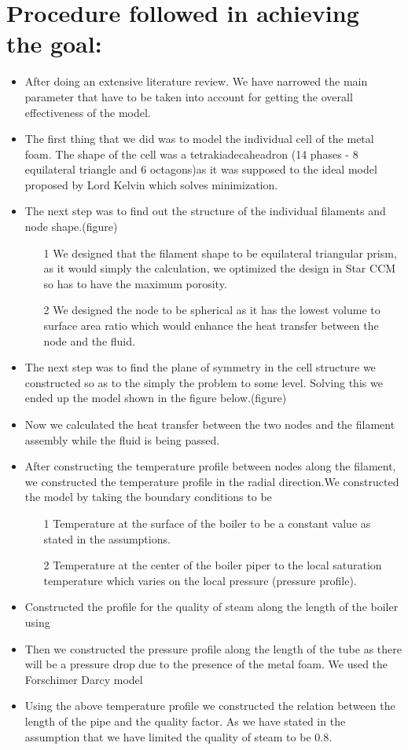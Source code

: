 \documentclass[compileTAMUreport.tex]{subfiles}
\begin{document}
\section{Procedure followed in achieving the goal:}
\begin{itemize}
\item After doing an extensive literature review. We have narrowed the main parameter that have to be taken into account for getting the overall effectiveness of the model.
\item The first thing that we did was to model the individual cell of the metal foam. The shape of the cell was a tetrakiadecaheadron (14 phases - 8 equilateral triangle and 6 octagons)as it was supposed to the ideal model proposed by Lord Kelvin which solves minimization.
\item The next step was to find out the structure of the individual filaments and node shape.(figure)
\begin{itemize}
\item[1] We designed that the filament shape to be equilateral triangular prism, as it would simply the calculation, we optimized the design in Star CCM so has to have the maximum porosity.
\item[2] We designed the node to be spherical as it has the lowest volume to surface area ratio which would enhance the heat transfer between the node and the fluid.
\end{itemize}
\item	The next step was to find the plane of symmetry in the cell structure we constructed so as to the simply the problem to some level. Solving this we ended up the model shown in the figure below.(figure)
\item	Now we calculated the heat transfer between the two nodes and the filament assembly while the fluid is being passed.
\item After constructing the temperature profile between nodes along the filament, we constructed the temperature profile in the radial direction.We constructed the model by taking the boundary conditions to be 
\begin{itemize}

\item[1]Temperature at the surface of the boiler to be a constant value as stated in the assumptions.
\item[2]Temperature at the center of the boiler piper to the local saturation temperature which varies on the local pressure (pressure profile).
\end{itemize}
\item	Constructed the profile for the quality of steam along the length of the boiler using 
\item	Then we constructed the pressure profile along the length of the tube as there will be a pressure drop due to the presence of the metal foam.  We used the Forschimer Darcy model 

\item Using the above temperature profile we constructed the relation between the length of the pipe and the quality factor. As we have stated in the assumption that we have limited the quality of steam to be 0.8.
\end{itemize}
\end{document}
